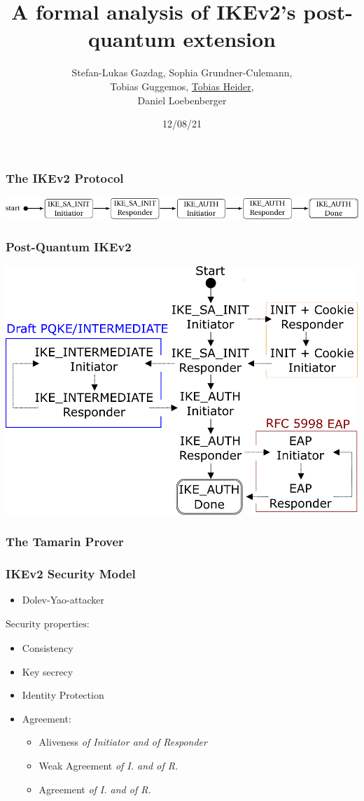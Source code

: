 \documentclass{beamer}
\title{A formal analysis of IKEv2's post-quantum extension}
\author{Stefan-Lukas Gazdag, Sophia Grundner-Culemann,\\
    Tobias Guggemos, \underline{Tobias Heider},\\
    Daniel Loebenberger}
\institute{ACSAC2021}
\date{12/08/21}
\begin{document}
\begin{frame}
	\titlepage
\end{frame}

\begin{frame}
\frametitle{The IKEv2 Protocol}
\includegraphics[width=\textwidth]{ike-state-machine.pdf}
\end{frame}

\begin{frame}
\frametitle{Post-Quantum IKEv2}
\includegraphics[width=\textwidth]{statemachine.pdf}
\end{frame}

\begin{frame}
\frametitle{The Tamarin Prover}
\end{frame}

\begin{frame}
\frametitle{IKEv2 Security Model}
\begin{itemize}
	\item Dolev-Yao-attacker
\end{itemize}
\pause
\bigskip
$\underline{\text{Security properties:}}$              
\pause
\begin{itemize}	
	\item Consistency
	\pause
	\item Key secrecy
	\pause
	\item Identity Protection
	\pause
	\item Agreement: \smallskip
	\pause
	\begin{itemize}
		\item Aliveness \textit{of Initiator and of Responder} 
		\pause        
		\item Weak Agreement \textit{of I. and of R.}
		\pause
		\item Agreement\textit{ of I. and of R.}		
	\end{itemize}
	
\end{itemize}
\end{frame}
\end{document}
